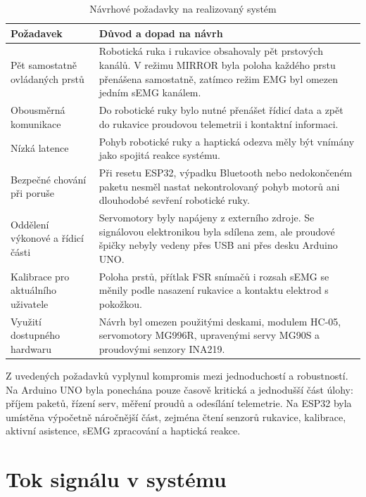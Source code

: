 \documentclass[FZS,DP]{tulthesis}
\begin{document}
\begin{table}[H]
\centering
\caption{Návrhové požadavky na realizovaný systém}
\label{tab:pozadavky-system}
\begin{tabular}{|p{}|p{}|}
\hline
\textbf{Požadavek} & \textbf{Důvod a dopad na návrh} \\
\hline
Pět samostatně ovládaných prstů & Robotická ruka i rukavice obsahovaly pět prstových kanálů. V režimu MIRROR byla poloha každého prstu přenášena samostatně, zatímco režim EMG byl omezen jedním sEMG kanálem. \\
\hline
Obousměrná komunikace & Do robotické ruky bylo nutné přenášet řídicí data a zpět do rukavice proudovou telemetrii i kontaktní informaci. \\
\hline
Nízká latence & Pohyb robotické ruky a haptická odezva měly být vnímány jako spojitá reakce systému. \\
\hline
Bezpečné chování při poruše & Při resetu ESP32, výpadku Bluetooth nebo nedokončeném paketu nesměl nastat nekontrolovaný pohyb motorů ani dlouhodobé sevření robotické ruky. \\
\hline
Oddělení výkonové a řídicí části & Servomotory byly napájeny z externího zdroje. Se signálovou elektronikou byla sdílena zem, ale proudové špičky nebyly vedeny přes USB ani přes desku Arduino UNO\@. \\
\hline
Kalibrace pro aktuálního uživatele & Poloha prstů, přítlak FSR snímačů i rozsah sEMG se měnily podle nasazení rukavice a kontaktu elektrod s pokožkou. \\
\hline
Využití dostupného hardwaru & Návrh byl omezen použitými deskami, modulem HC-05, servomotory MG996R, upravenými servy MG90S a proudovými senzory INA219. \\
\hline
\end{tabular}
\end{table}

Z uvedených požadavků vyplynul kompromis mezi jednoduchostí a robustností. Na Arduino UNO byla ponechána pouze časově kritická a jednodušší část úlohy: příjem paketů, řízení serv, měření proudů a odesílání telemetrie. Na ESP32 byla umístěna výpočetně náročnější část, zejména čtení senzorů rukavice, kalibrace, aktivní asistence, sEMG zpracování a haptická reakce.

\section{Tok signálu v systému}
\label{sec:tok-signalu}
\end{document}
